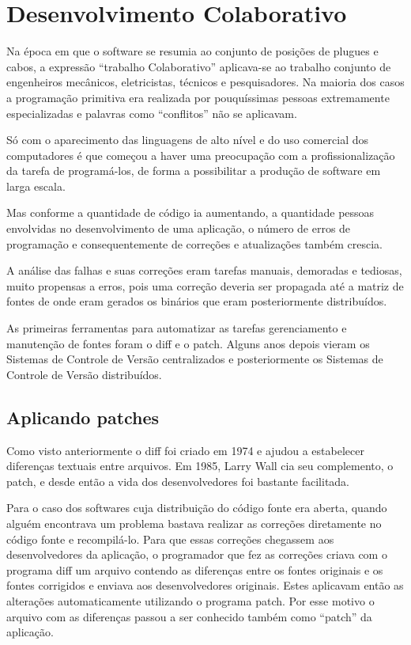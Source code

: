 \chapter{Desenvolvimento Colaborativo}

Na época em que o software se resumia ao conjunto de posições de plugues e cabos, a expressão ``trabalho Colaborativo'' aplicava-se ao trabalho conjunto de engenheiros mecânicos, eletricistas, técnicos e pesquisadores. Na maioria dos casos a programação primitiva era realizada por pouquíssimas pessoas extremamente especializadas e palavras como ``conflitos'' não se aplicavam.

Só com o aparecimento das linguagens de alto nível e do uso comercial dos computadores é que começou a haver uma preocupação com a profissionalização da tarefa de programá-los, de forma a possibilitar a produção de software em larga escala.

Mas conforme a quantidade de código ia aumentando, a quantidade pessoas envolvidas no desenvolvimento de uma aplicação, o número de erros de programação e consequentemente de correções e atualizações também crescia.

A análise das falhas e suas correções eram tarefas manuais, demoradas e tediosas, muito propensas a erros, pois uma correção deveria ser propagada até a matriz de fontes de onde eram gerados os binários que eram posteriormente distribuídos.

As primeiras ferramentas para automatizar as tarefas gerenciamento e manutenção de fontes foram o diff e o patch. Alguns anos depois vieram os Sistemas de Controle de Versão centralizados e posteriormente os Sistemas de Controle de Versão distribuídos.


\section{Aplicando patches}

Como visto anteriormente o diff foi criado em 1974 e ajudou a estabelecer diferenças textuais entre arquivos. Em 1985, Larry Wall cia seu complemento, o patch, e desde então a vida dos desenvolvedores foi bastante facilitada.

Para o caso dos softwares cuja distribuição do código fonte era aberta, quando alguém encontrava um problema bastava realizar as correções diretamente no código fonte e recompilá-lo. Para que essas correções chegassem aos desenvolvedores da aplicação, o programador que fez as correções criava com o programa diff um arquivo contendo as diferenças entre os fontes originais e os fontes corrigidos e enviava aos desenvolvedores originais. Estes aplicavam então as alterações automaticamente utilizando o programa patch. Por esse motivo o arquivo com as diferenças passou a ser conhecido também como ``patch'' da aplicação.

